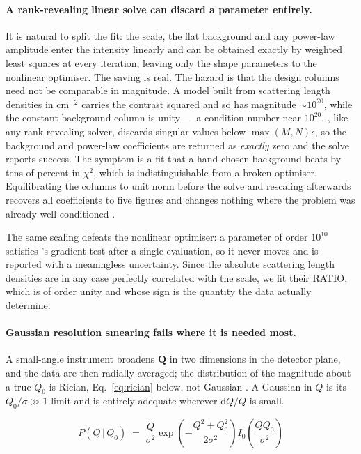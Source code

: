 \paragraph{A rank-revealing linear solve can discard a parameter entirely.}
It is natural to split the fit: the scale, the flat background and any
power-law amplitude enter the intensity linearly and can be obtained exactly
by weighted least squares at every iteration, leaving only the shape
parameters to the nonlinear optimiser. The saving is real. The hazard is
that the design columns need not be comparable in magnitude. A model built
from scattering length densities in $\mathrm{cm}^{-2}$ carries the contrast
squared and so has magnitude $\sim10^{20}$, while the constant background
column is unity --- a condition number near $10^{20}$.
, like any rank-revealing solver, discards singular
values below $\max(M,N)\epsilon$, so the background and power-law
coefficients are returned as \emph{exactly} zero and the solve reports
success. The symptom is a fit that a hand-chosen background beats by tens of
percent in $\chi^2$, which is indistinguishable from a broken optimiser.
Equilibrating the columns to unit norm before the solve and rescaling
afterwards recovers all coefficients to five figures and changes nothing
where the problem was already well conditioned \citep{GolubVanLoan2013}.

The same scaling defeats the nonlinear optimiser: a parameter of order
$10^{10}$ satisfies 's gradient test after a single
evaluation, so it never moves and is reported with a meaningless
uncertainty. Since the absolute scattering length densities are in any case
perfectly correlated with the scale, we fit their RATIO, which is of order
unity and whose sign is the quantity the data actually determine.

\paragraph{Gaussian resolution smearing fails where it is needed most.} A
small-angle instrument broadens $\mathbf{Q}$ in two dimensions in the
detector plane, and the data are then radially averaged; the distribution of
the magnitude about a true $Q_0$ is Rician, Eq.~\eqref{eq:rician} below, not
Gaussian \citep{Pedersen1990,BarkerPedersen1995}. A Gaussian in $Q$ is its
$Q_0/\sigma \gg 1$ limit and is entirely adequate wherever
$\mathrm{d}Q/Q$ is small.

\begin{equation}
  P(Q\,|\,Q_0) \;=\; \frac{Q}{\sigma^{2}}
  \exp\!\left(-\frac{Q^{2}+Q_0^{2}}{2\sigma^{2}}\right)
  I_0\!\left(\frac{QQ_0}{\sigma^{2}}\right)
  \label{eq:rician}
\end{equation}

